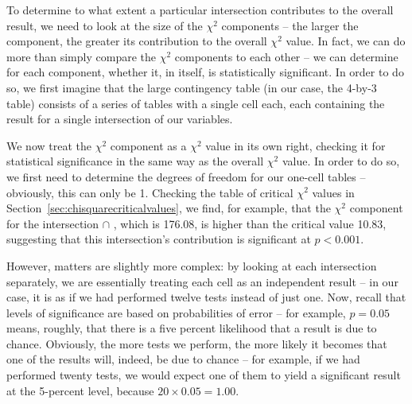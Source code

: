 To determine to what extent a particular intersection contributes to the overall result, we need to look at the size of the $\chi^2$ components -- the larger the component, the greater its contribution to the overall $\chi^2$  value. In fact, we can do more than simply compare the $\chi^2$ components to each other -- we can determine for each component, whether it, in itself, is statistically significant.  In order to do so, we first imagine that the large contingency  table (in our case, the 4\hyp{}by\hyp{}3 table) consists of a series of tables with a single cell each, each containing the result for a single intersection of our variables.

We now treat the $\chi^2$ component as a $\chi^2$ value in its own right, checking it for statistical significance  in the same way as the overall $\chi^2$ value. In order to do so, we first need to determine the degrees of freedom for our one\hyp{}cell tables -- obviously, this can only be 1. Checking the table of critical $\chi^2$  values in Section~\ref{sec:chisquarecriticalvalues}, we find, for example, that the $\chi^2$ component for the intersection   $\cap$ ,  which is 176.08, is higher than the critical value 10.83, suggesting that this intersection's contribution is significant  at $p < 0.001$.

However, matters are slightly more complex: by looking at each intersection separately, we are essentially treating each cell as an independent result -- in our case, it is as if we had performed twelve tests instead of just one. Now, recall that levels of significance  are based on probabilities  of error -- for example, $p = 0.05$ means, roughly, that there is a five percent likelihood that a result is due to chance.  Obviously, the more tests we perform, the more likely it becomes that one of the results will, indeed, be due to chance  -- for example, if we had performed twenty tests, we would expect one of them to yield a significant result at the 5\hyp{}percent level, because $20 \times 0.05 = 1.00$.

